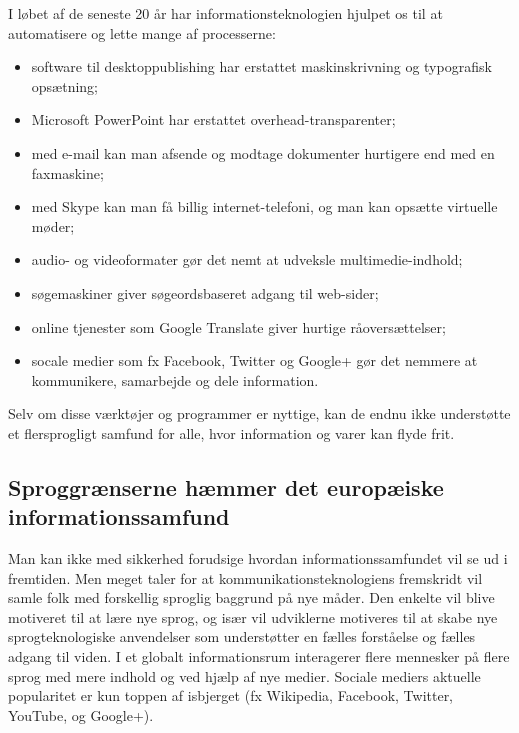 \begin{multicols}{2}
I l\o bet af de seneste 20 \aa r har informationsteknologien hjulpet os til at automatisere og lette mange af processerne:

\begin{itemize}
\item software til desktoppublishing har erstattet maskinskrivning og typografisk ops\ae tning;
\item Microsoft PowerPoint har erstattet over\-head-transparenter;
\item med e-mail kan man afsende og modtage dokumenter hurtigere end med en faxmaskine;
\item med Skype kan man \mbox{f\aa} billig internet-telefoni, og man kan ops\ae tte virtuelle m\o der;
\item audio- og videoformater g\o r det nemt at udveksle multimedie-indhold;
\item s\o gemaskiner giver s\o geordsbaseret adgang til web-sider;
\item online tjenester som Google Translate giver hurtige r\aa overs\ae ttelser;
\item socale medier som fx Facebook, Twitter og Google+ g\o r det nemmere at kommunikere, samarbejde og dele information.
\end{itemize}

Selv om disse v\ae rkt\o jer og programmer er nyttige, kan de endnu ikke underst\o tte et flersprogligt samfund for alle, hvor information og varer kan flyde frit.


\subsection{Sproggr\ae nserne h\ae mmer det europ\ae iske informationssamfund}
  
Man kan ikke med sikkerhed forudsige hvordan informationssamfundet vil se ud i fremtiden. Men meget taler for at kommunikationsteknologiens fremskridt vil samle folk med forskellig sproglig baggrund \mbox{p\aa} nye m\aa der. Den enkelte vil blive motiveret til at l\ae re nye sprog, og is\ae r vil udviklerne motiveres til at skabe nye sprogteknologiske anvendelser som underst\o tter en f\ae lles forst\aa else og f\ae lles adgang til viden.
I et glo\-balt informationsrum interagerer flere mennesker \mbox{p\aa} flere sprog med mere indhold og ved hj\ae lp af nye medier. Sociale mediers aktuelle popularitet er kun toppen af isbjerget (fx Wikipedia, Facebook, Twitter, YouTube, og Google+).



\end{multicols}
